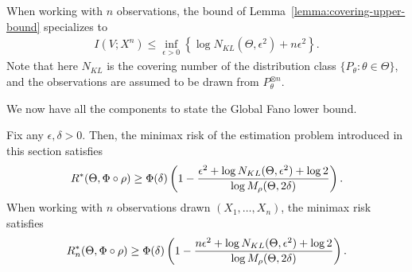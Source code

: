 \documentclass[12pt]{article}
\begin{document}
\begin{remark}
	\label{remark:iid-observations} When working with $n$ \iid observations, the bound of Lemma~\ref{lemma:covering-upper-bound} specializes to 
	\begin{align}
		I(V; X^n) \leq \inf_{\epsilon>0}\left\{ \log N_{KL}(\Theta, \epsilon^2) + n \epsilon^2 \right\}. 
	\end{align}
	Note that here $N_{KL}$ is the covering number of the distribution class $\{P_\theta: \theta \in \Theta\}$, and the observations are assumed to be drawn from $P_\theta^{\otimes n}$. 
\end{remark}

We now have all the components to state the Global Fano lower bound. 
\begin{theorem}
	\label{theorem:global-fano}
	Fix any $\epsilon, \delta>0$. Then, the minimax risk of the estimation problem introduced in this section satisfies 
	\begin{align}
		R^*(\Theta, \Phi \circ \rho) \geq \Phi(\delta) \left( 1- \frac{\epsilon^2 + \log N_{KL}(\Theta, \epsilon^2) + \log 2}{\log M_{\rho}(\Theta, 2\delta)} \right). 
	\end{align}
	When working with $n$ \iid observations drawn $(X_1, \ldots, X_n)$, the minimax risk satisfies 
	\begin{align}
		R^*_n(\Theta, \Phi \circ \rho) \geq \Phi(\delta) \left( 1- \frac{n \epsilon^2 + \log N_{KL}(\Theta, \epsilon^2) + \log 2}{\log M_{\rho}(\Theta, 2\delta)} \right). 
	\end{align}
\end{theorem}
\end{document}
